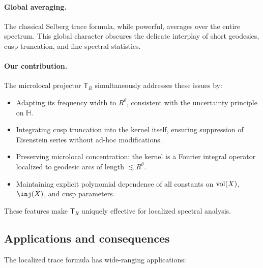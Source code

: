 \paragraph{Global averaging.}
The classical Selberg trace formula, while powerful, averages over the entire spectrum. 
This global character obscures the delicate interplay of short geodesics, cusp truncation, 
and fine spectral statistics.

\paragraph{Our contribution.}
The microlocal projector $\mathsf{T}_R$ simultaneously addresses these issues by:
\begin{itemize}
  \item Adapting its frequency width to $R^\theta$, consistent with the uncertainty 
        principle on $\mathbb{H}$.
  \item Integrating cusp truncation into the kernel itself, ensuring suppression of 
        Eisenstein series without ad-hoc modifications.
  \item Preserving microlocal concentration: the kernel is a Fourier integral operator 
        localized to geodesic arcs of length $\lesssim R^\theta$.
  \item Maintaining explicit polynomial dependence of all constants on $\operatorname{vol}(X)$, 
        $\inj(X)$, and cusp parameters.
\end{itemize}

These features make $\mathsf{T}_R$ uniquely effective for localized spectral analysis.

\subsection{Applications and consequences}\label{subsec:applications}

The localized trace formula has wide-ranging applications:

